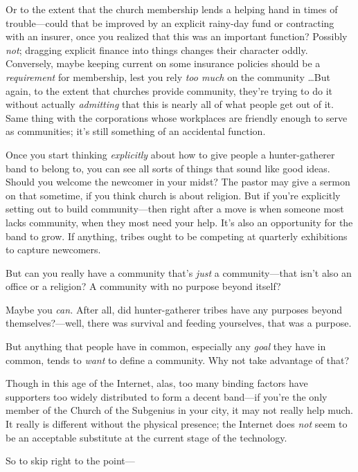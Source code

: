 {
 Or to the extent that the church membership lends a helping hand
in times of trouble---could that be improved by an explicit rainy-day
fund or contracting with an insurer, once you realized that this was an
important function? Possibly \textit{not}; dragging explicit finance
into things changes their character oddly. Conversely, maybe keeping
current on some insurance policies should be a \textit{requirement} for
membership, lest you rely \textit{too much} on the community \ldots But
again, to the extent that churches provide community,
they're trying to do it without actually
\textit{admitting} that this is nearly all of what people get out of
it. Same thing with the corporations whose workplaces are friendly
enough to serve as communities; it's still something of
an accidental function.}

{
 Once you start thinking \textit{explicitly} about how to give
people a hunter-gatherer band to belong to, you can see all sorts of
things that sound like good ideas. Should you welcome the newcomer in
your midst? The pastor may give a sermon on that sometime, if you think
church is about religion. But if you're explicitly
setting out to build community---then right after a move is when
someone most lacks community, when they most need your help.
It's also an opportunity for the band to grow. If
anything, tribes ought to be competing at quarterly exhibitions to
capture newcomers.}

{
 But can you really have a community that's
\textit{just} a community---that isn't also an office
or a religion? A community with no purpose beyond itself?}

{
 Maybe you \textit{can.} After all, did hunter-gatherer tribes have
any purposes beyond themselves?---well, there was survival and feeding
yourselves, that was a purpose.}

{
 But anything that people have in common, especially any
\textit{goal} they have in common, tends to \textit{want} to define a
community. Why not take advantage of that?}

{
 Though in this age of the Internet, alas, too many binding factors
have supporters too widely distributed to form a decent band---if
you're the only member of the Church of the Subgenius
in your city, it may not really help much. It really is different
without the physical presence; the Internet does \textit{not} seem to
be an acceptable substitute at the current stage of the technology.}

{
 So to skip right to the point---}

